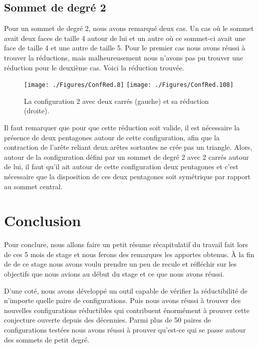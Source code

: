 \documentclass[10pt,a4paper]{article}
\begin{document}
\newpage
\subsection{Sommet de degré 2}
Pour un sommet de degré 2, nous avons remarqué deux cas. Un cas où le sommet avait deux faces de taille 4 autour de lui et un autre où ce sommet-ci avait une face de taille 4 et une autre de taille 5. Pour le premier cas nous avons réussi à trouver la réductions, mais malheureusement nous n'avons pas pu trouver une réduction pour le deuxième cas. Voici la réduction trouvée.

\begin{figure}[ht]
\centerline{
\texttt{[image: ./Figures/ConfRed.8]}
\hfil
\texttt{[image: ./Figures/ConfRed.108]}
}
\caption{La configuration 2 avec deux carrés (gauche) et sa réduction (droite).}
\label{fig:2CC}
\end{figure}

Il faut remarquer que pour que cette réduction soit valide, il est nécessaire la présence de deux pentagones autour de cette configuration, afin que la contraction de l'arête reliant deux arêtes sortantes ne crée pas un triangle. Alors, autour de la configuration défini par un sommet de degré 2 avec 2 carrés autour de lui, il faut qu'il ait autour de cette configuration deux pentagones et c'est nécessaire que la disposition de ces deux pentagones soit symétrique par rapport au sommet central. 

\section{Conclusion}
\label{chap:concl}
Pour conclure, nous allons faire un petit résume récapitulatif du travail fait lors de ces 5 mois de stage et nous ferons des remarques les apportes obtenus. À la fin de de ce stage nous avons voulu prendre un peu de recule et réfléchir sur les objectifs que nous avions au début du stage et ce que nous avons réussi. 

D'une coté, nous avons développé un outil capable de vérifier la réductibilité de n'importe quelle paire de configurations. Puis nous avons réussi à trouver des nouvelles configurations réductibles qui contribuent énormément à prouver cette conjecture ouverte depuis des décennies. Parmi plus de 50 paires de configurations testées nous avons réussi à prouver qu'est-ce qui se passe autour des sommets de petit degré.
\end{document}

